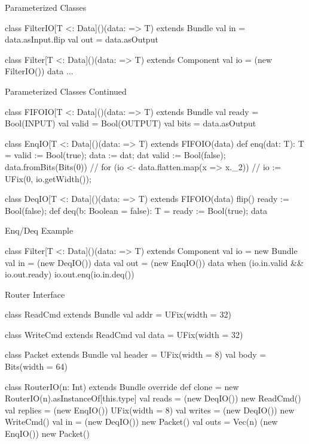\documentclass[xcolor=pdflatex,dvipsnames,table]{beamer}
\begin{document}
\begin{frame}[fragile]{Parameterized Classes}
\begin{scala}
class FilterIO[T <: Data]()(data: => T) extends Bundle { 
  val in  = data.asInput.flip
  val out = data.asOutput
}

class Filter[T <: Data]()(data: => T) extends Component { 
  val io = (new FilterIO()){ data }
  ...
}
\end{scala}
\end{frame}

\begin{frame}[fragile]{Parameterized Classes Continued}
\begin{scala}
class FIFOIO[T <: Data]()(data: => T) extends Bundle {
  val ready = Bool(INPUT)
  val valid = Bool(OUTPUT)
  val bits  = data.asOutput
}

class EnqIO[T <: Data]()(data: => T) extends FIFOIO(data) {
  def enq(dat: T): T = { valid := Bool(true); data := dat; dat }
  valid := Bool(false);
  data.fromBits(Bits(0))
  // for (io <- data.flatten.map(x => x._2))
  //   io := UFix(0, io.getWidth());
}

class DeqIO[T <: Data]()(data: => T) extends FIFOIO(data) {
  flip()
  ready := Bool(false);
  def deq(b: Boolean = false): T = { ready := Bool(true); data }
}
\end{scala}
\end{frame}

\begin{frame}[fragile]{Enq/Deq Example}
\begin{scala}
class Filter[T <: Data]()(data: => T) extends Component {
  val io = new Bundle {
    val in  = (new DeqIO()){ data }
    val out = (new EnqIO()){ data }
  }
  when (io.in.valid && io.out.ready) {
    io.out.enq(io.in.deq())
  }
}
\end{scala}
\end{frame}

\begin{frame}[fragile]{Router Interface}

{
\begin{scala}
class ReadCmd extends Bundle {
  val addr = UFix(width = 32)
}

class WriteCmd extends ReadCmd {
  val data = UFix(width = 32)
}

class Packet extends Bundle {
  val header = UFix(width = 8)
  val body   = Bits(width = 64)
}

class RouterIO(n: Int) extends Bundle {
  override def clone = new RouterIO(n).asInstanceOf[this.type]
  val reads   = (new DeqIO()){ new ReadCmd() }
  val replies = (new EnqIO()){ UFix(width = 8) }
  val writes  = (new DeqIO()){ new WriteCmd() }
  val in      = (new DeqIO()){ new Packet() }
  val outs    = Vec(n){ (new EnqIO()){ new Packet() } }
}
\end{scala}
}

\end{frame}
\end{document}
